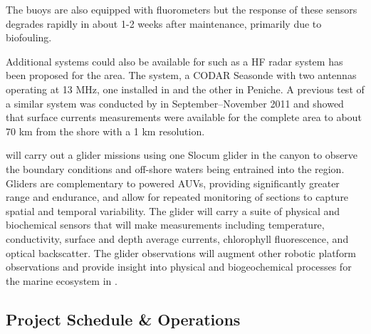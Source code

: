 \noindent
The buoys are also equipped with fluorometers but the response of these
sensors degrades rapidly in about 1-2 weeks after maintenance,
primarily due to biofouling.

Additional systems could also be available for \proj such as %
a HF radar system has been proposed for the \naz area. The system, a
CODAR Seasonde with two antennas operating at 13 MHz, one installed in
\naz and the other in Peniche. A previous test of a similar system was
conducted by \inst in September--November 2011 and showed that surface
currents measurements were available for the complete area to about 70
km from the shore with a 1 km resolution.

\soc will carry out a glider missions using one Slocum glider in the
\naz canyon to observe the boundary conditions and off-shore waters
being entrained into the region. %
Gliders are complementary to powered AUVs, providing significantly
greater range and endurance, and allow for repeated monitoring of
sections to capture spatial and temporal
variability. %
The \soc glider will carry a suite of physical and biochemical sensors
that will make measurements including temperature, conductivity,
surface and depth average currents, chlorophyll fluorescence, and
optical backscatter. The glider observations will augment other
robotic platform observations and provide insight into physical and
biogeochemical processes for the marine ecosystem in
\naze. %

  
\subsection{Project Schedule \& Operations}
\label{sec:atsea-ops}


